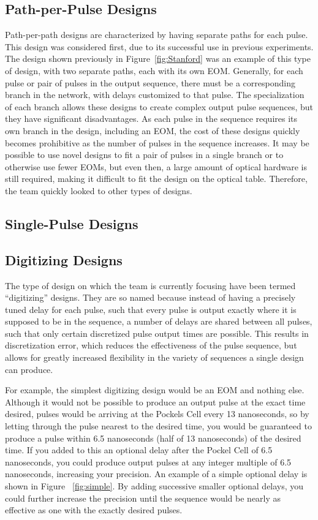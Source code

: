 \documentclass[pdftex,12pt,a4paper]{article}
\begin{document}
\subsection{Path-per-Pulse Designs}
Path-per-path designs are characterized by having separate paths for each pulse. This design was considered first, due to its successful use in previous experiments. The design shown previously in Figure~\ref{fig:Stanford} was an example of this type of design, with two separate paths, each with its own EOM. Generally,  for each pulse or pair of pulses in the output sequence, there must be a corresponding branch in the network, with delays customized to that pulse. The specialization of each branch allows these designs to create complex output pulse sequences, but they have significant disadvantages. As each pulse in the sequence requires its own branch in the design, including an EOM, the cost of these designs quickly becomes prohibitive as the number of pulses in the sequence increases. It may be possible to use novel designs to fit a pair of pulses in a single branch or to otherwise use fewer EOMs, but even then, a large amount of optical hardware is still required, making it difficult to fit the design on the optical table. Therefore, the team quickly looked to other types of designs.

\subsection{Single-Pulse Designs}



\subsection{Digitizing Designs}
\label{sec:digitizingDesign}
The type of design on which the team is currently focusing have been termed “digitizing” designs. They are so named because instead of having a precisely tuned delay for each pulse, such that every pulse is output exactly where it is supposed to be in the sequence, a number of delays are shared between all pulses, such that only certain discretized pulse output times are possible. This results in discretization error, which reduces the effectiveness of the pulse sequence, but allows for greatly increased flexibility in the variety of sequences a single design can produce.

	For example, the simplest digitizing design would be an EOM and nothing else. Although it would not be possible to produce an output pulse at the exact time desired, pulses would be arriving at the Pockels Cell every 13 nanoseconds, so by letting through the pulse nearest to the desired time, you would be guaranteed to produce a pulse within 6.5 nanoseconds (half of 13 nanoseconds) of the desired time. If you added to this an optional delay after the Pockel Cell of 6.5 nanoseconds, you could produce output pulses at any integer multiple of 6.5 nanoseconds, increasing your precision. An example of a simple optional delay is shown in Figure ~\ref{fig:simple}. By adding successive smaller optional delays, you could further increase the precision until the sequence would be nearly as effective as one with the exactly desired pulses.
    
\end{document}
